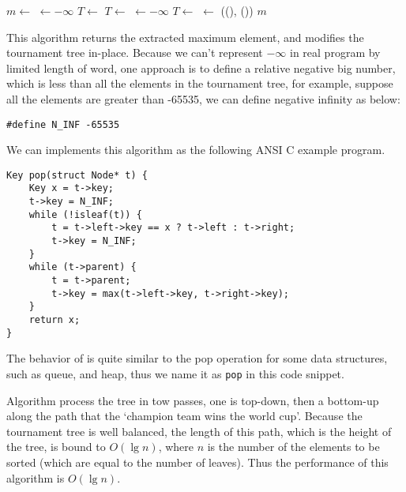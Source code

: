 \documentclass[UTF8]{article}
\begin{document}
\begin{algorithmic}
  \State $m \gets$ 
  \State {} $\gets -\infty$
    
      \State $T \gets$ 
    \Else
      \State $T \gets$ 
    \EndIf
    \State {} $\gets -\infty$
  \EndWhile
   
    \State $T \gets$ 
    \State {} $\gets$ ((), ())
  \EndWhile
  \State \Return $m$
\EndFunction
\end{algorithmic}

This algorithm returns the extracted maximum element, and modifies the tournament tree in-place.
Because we can't represent $-\infty$ in real program by limited length of word, one approach is to define
a relative negative big number, which is less than all the elements in the tournament tree, for example,
suppose all the elements are greater than -65535, we can define negative infinity as below:

\lstset{language=C}
\begin{lstlisting}
#define N_INF -65535
\end{lstlisting}

We can implements this algorithm as the following ANSI C example program.

\lstset{language=C}
\begin{lstlisting}
Key pop(struct Node* t) {
    Key x = t->key;
    t->key = N_INF;
    while (!isleaf(t)) {
        t = t->left->key == x ? t->left : t->right;
        t->key = N_INF;
    }
    while (t->parent) {
        t = t->parent;
        t->key = max(t->left->key, t->right->key);
    }
    return x;
}
\end{lstlisting}

The behavior of  is quite similar to the pop operation for some data structures,
such as queue, and heap, thus we name it as \verb|pop| in this code snippet.

Algorithm  process the tree in tow passes, one is top-down, then a bottom-up along
the path that the `champion team wins the world cup'.
Because the tournament tree is well balanced,
the length of this path, which is the height of the tree, is bound to $O(\lg n)$,
where $n$ is the number of the elements to be sorted (which are equal to the number of leaves).
Thus the performance of this algorithm is $O(\lg n)$.
\end{document}

